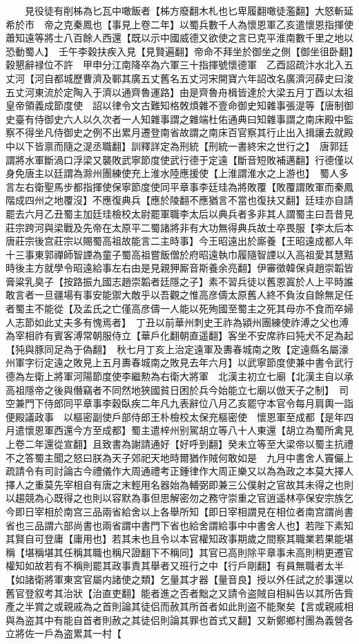 　　見役徒有削柹為匕瓦中噉飯者【柹方廢翻木札也匕卑履翻噉徒濫翻】大怒斬延希於市　帝之克秦鳳也【事見上卷二年】以蜀兵數千人為懷恩軍乙亥遣懷恩指揮使蕭知遠等將士八百餘人西還【既以示中國威德又欲使之言已克平淮南數千里之地以恐動蜀人】　壬午李穀扶疾入見【見賢遍翻】帝命不拜坐於御坐之側【御坐徂卧翻】穀懇辭禄位不許　甲申分江南降卒為六軍三十指揮號懷德軍　乙酉詔疏汴水北入五丈河【河自都城歷曹濟及鄆其廣五丈舊名五丈河宋開寶六年詔改名廣濟河薛史曰浚五丈河東流於定陶入于濟以通齊魯運路】由是齊魯舟楫皆達於大梁五月丁酉以太祖皇帝領義成節度使　詔以律令文古難知格敇煩雜不壹命御史知雜事張湜等【唐制御史臺有侍御史六人以久次者一人知雜事謂之雜端杜佑通典曰知雜事謂之南床殿中監察不得坐凡侍御史之例不出累月遷登南省故謂之南床百官察其行止出入揖讓去就殿中以下皆禀而隨之湜丞職翻】訓釋詳定為刑統【刑統一書終宋之世行之】　唐郭廷謂將水軍斷渦口浮梁又襲敗武寧節度使武行德于定遠【斷音短敗補邁翻】行德僅以身免唐主以廷謂為滁州團練使充上淮水陸應援使【上淮謂淮水之上游也】　蜀人多言左右衛聖馬步都指揮使保寧節度使同平章事李廷珪為將敗覆【敗覆謂敗軍而秦鳳階成四州之地覆沒】不應復典兵【應於陵翻不應猶言不當也復扶又翻】廷珪亦自請罷去六月乙丑蜀主加廷珪檢校太尉罷軍職李太后以典兵者多非其人謂蜀主曰吾昔見莊宗跨河與梁戰及先帝在太原平二蜀諸將非有大功無得典兵故士卒畏服【李太后本唐莊宗後宫莊宗以賜蜀高祖故能言二主時事】今王昭遠出於廝養【王昭遠成都人年十三事東郭禪師智諲為童子蜀高祖嘗飯僧於府昭遠執巾履隨智諲以入高祖愛其慧黠時後主方就學令昭遠給事左右由是見親狎厮音斯養余亮翻】伊審徵韓保貞趙崇韜皆膏粱乳臭子【按路振九國志趙崇韜者廷隱之子】素不習兵徒以舊恩寘於人上平時誰敢言者一旦疆場有事安能禦大敵乎以吾觀之惟高彦儔太原舊人終不負汝自餘無足任者蜀主不能從【及孟氏之亡僅高彦儔一人能以死殉國至蜀主之死其母亦不食而卒婦人志節如此丈夫多有愧焉者】　丁丑以前華州刺史王祚為潁州團練使祚溥之父也溥為宰相祚有賓客溥常朝服侍立【華戶化翻朝直遥翻】客坐不安席祚曰㹠犬不足為起【㹠與豚同足為于偽翻】　秋七月丁亥上治定遠軍及夀春城南之敗【定遠縣名屬濠州軍字衍定遠之敗見上五月夀春城南之敗見去年六月】以武寧節度使兼中書令武行德為左衛上將軍河陽節度使李繼勲為右衛大將軍　北漢主初立七廟【北漢主自以承高祖隱帝之後與僭竊者不同然地狹國貧日困於兵今始能立七廟以倣天子之制】　司空兼門下侍郎同平章事李穀臥疾二年凡九表辭位八月乙亥罷守本官令每月肩輿一詣便殿議政事　以樞密副使戶部侍郎王朴檢校太保充樞密使　懷恩軍至成都【是年四月遣懷恩軍西還今方至成都】蜀主遣梓州别駕胡立等八十人東還【胡立為蜀所禽見上卷二年還從宣翻】且致書為謝請通好【好呼到翻】癸未立等至大梁帝以蜀主抗禮不之答蜀主聞之怒曰朕為天子郊祀天地時爾猶作賊何敢如是　九月中書舍人竇儼上疏請令有司討論古今禮儀作大周通禮考正鍾律作大周正樂又以為為政之本莫大擇人擇人之重莫先宰相自有唐之末輕用名器始為輔弼即兼三公僕射之官故其未得之也則以趨競為心既得之也則以容默為事但思解密勿之務守崇重之官逍遥林亭保安宗族乞今即日宰相於南宫三品兩省給舍以上各舉所知【即日宰相謂見在相位者南宫謂尚書省也三品謂六部尚書也兩省謂中書門下省也給舍謂給事中中書舍人也】若陛下素知其賢自可登庸【庸用也】若其未也且令以本官權知政事期歲之間察其職業若果能堪稱【堪稱堪其任稱其職也稱尺證翻下不稱同】其官已高則除平章事未高則稍更遷官權知如故若有不稱則罷其政事責其舉者又班行之中【行戶剛翻】有員無職者太半【如諸衛將軍東宮官屬内諸使之類】乞量其才器【量音良】授以外任試之於事還以舊官登叙考其治狀【治直吏翻】能者進之否者黜之又請令盗賊自相糾告以其所告貲產之半賞之或親戚為之首則論其徒侣而赦其所首者如此則盗不能聚矣【言或親戚相與為盗其中有能自首者則赦之其徒侣則論其罪也首式又翻】又新鄭鄉村團為義營各立將佐一戶為盗累其一村【